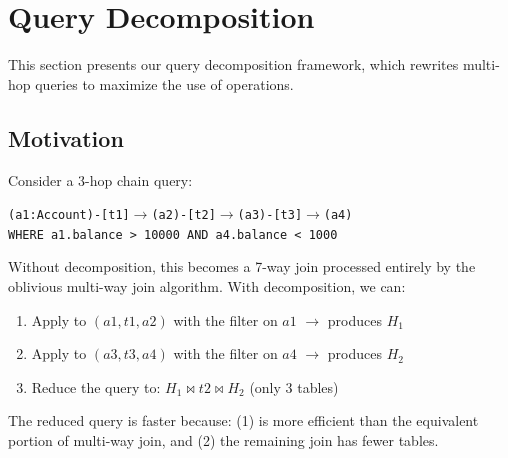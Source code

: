 \section{Query Decomposition}
\label{sec:decomposition}

This section presents our query decomposition framework, which rewrites multi-hop queries to maximize the use of \onehop operations.

\subsection{Motivation}
\label{sec:decomposition:motivation}

Consider a 3-hop chain query:
\begin{center}
\small
\texttt{(a1:Account)-[t1]$\rightarrow$(a2)-[t2]$\rightarrow$(a3)-[t3]$\rightarrow$(a4)}\\
\texttt{WHERE a1.balance > 10000 AND a4.balance < 1000}
\end{center}

Without decomposition, this becomes a 7-way join processed entirely by the oblivious multi-way join algorithm. With decomposition, we can:
\begin{enumerate}
    \item Apply \onehop to $(a1, t1, a2)$ with the filter on $a1$ $\rightarrow$ produces $H_1$
    \item Apply \onehop to $(a3, t3, a4)$ with the filter on $a4$ $\rightarrow$ produces $H_2$
    \item Reduce the query to: $H_1 \bowtie t2 \bowtie H_2$ (only 3 tables)
\end{enumerate}

The reduced query is faster because: (1) \onehop is more efficient than the equivalent portion of multi-way join, and (2) the remaining join has fewer tables.


